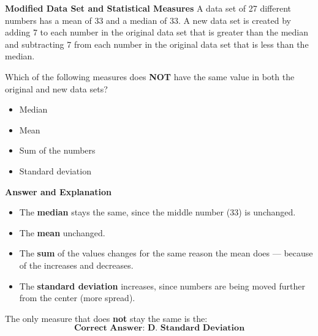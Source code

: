 \documentclass{beamer}
\begin{document}
\begin{frame}{\textbf{Modified Data Set and Statistical Measures}}
A data set of 27 different numbers has a mean of 33 and a median of 33. A new data set is created by adding 7 to each number in the original data set that is greater than the median and subtracting 7 from each number in the original data set that is less than the median.

Which of the following measures does \textbf{NOT} have the same value in both the original and new data sets?

\begin{itemize}
    \item[A.] Median
    \item[B.] Mean
    \item[C.] Sum of the numbers
    \item[D.] Standard deviation
\end{itemize}
\end{frame}

\begin{frame}{\textbf{Answer and Explanation}}
\begin{itemize}
    \item The \textbf{median} stays the same, since the middle number (33) is unchanged.
    \item The \textbf{mean} unchanged.
    \item The \textbf{sum} of the values changes for the same reason the mean does — because of the increases and decreases.
    \item The \textbf{standard deviation} increases, since numbers are being moved further from the center (more spread).
\end{itemize}

The only measure that does \textbf{not} stay the same is the:
\[
\textbf{Correct Answer: D. Standard Deviation}
\]
\end{frame}
\end{document}
